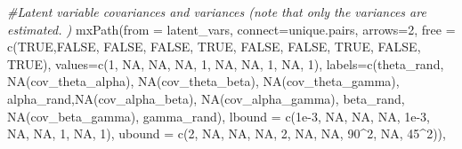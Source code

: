 \documentclass[
12pt, %
twoside,
english]{guelphthesis}
\newenvironment{Shaded}{\begin{snugshade}}{\end{snugshade}}
\newcommand{\AttributeTok}[1]{\textcolor[rgb]{0.77,0.63,0.00}{#1}}
\newcommand{\CommentTok}[1]{\textcolor[rgb]{0.56,0.35,0.01}{\textit{#1}}}
\newcommand{\ConstantTok}[1]{\textcolor[rgb]{0.00,0.00,0.00}{#1}}
\newcommand{\DecValTok}[1]{\textcolor[rgb]{0.00,0.00,0.81}{#1}}
\newcommand{\FloatTok}[1]{\textcolor[rgb]{0.00,0.00,0.81}{#1}}
\newcommand{\FunctionTok}[1]{\textcolor[rgb]{0.00,0.00,0.00}{#1}}
\newcommand{\NormalTok}[1]{#1}
\newcommand{\SpecialCharTok}[1]{\textcolor[rgb]{0.00,0.00,0.00}{#1}}
\newcommand{\StringTok}[1]{\textcolor[rgb]{0.31,0.60,0.02}{#1}}
\begin{document}
\begin{Shaded}
\begin{Highlighting}[numbers=left,,]
  \CommentTok{\#Latent variable covariances and variances (note that only the variances are estimated. )}
  \FunctionTok{mxPath}\NormalTok{(}\AttributeTok{from =}\NormalTok{ latent\_vars,}
         \AttributeTok{connect=}\StringTok{\textquotesingle{}unique.pairs\textquotesingle{}}\NormalTok{, }\AttributeTok{arrows=}\DecValTok{2}\NormalTok{,}
         \AttributeTok{free =} \FunctionTok{c}\NormalTok{(}\ConstantTok{TRUE}\NormalTok{,}\ConstantTok{FALSE}\NormalTok{, }\ConstantTok{FALSE}\NormalTok{, }\ConstantTok{FALSE}\NormalTok{, }
                  \ConstantTok{TRUE}\NormalTok{, }\ConstantTok{FALSE}\NormalTok{, }\ConstantTok{FALSE}\NormalTok{, }
                  \ConstantTok{TRUE}\NormalTok{, }\ConstantTok{FALSE}\NormalTok{, }
                  \ConstantTok{TRUE}\NormalTok{), }
         \AttributeTok{values=}\FunctionTok{c}\NormalTok{(}\DecValTok{1}\NormalTok{, }\ConstantTok{NA}\NormalTok{, }\ConstantTok{NA}\NormalTok{, }\ConstantTok{NA}\NormalTok{, }
                  \DecValTok{1}\NormalTok{, }\ConstantTok{NA}\NormalTok{, }\ConstantTok{NA}\NormalTok{, }
                  \DecValTok{1}\NormalTok{, }\ConstantTok{NA}\NormalTok{,}
                  \DecValTok{1}\NormalTok{),}
         \AttributeTok{labels=}\FunctionTok{c}\NormalTok{(}\StringTok{\textquotesingle{}theta\_rand\textquotesingle{}}\NormalTok{, }\StringTok{\textquotesingle{}NA(cov\_theta\_alpha)\textquotesingle{}}\NormalTok{, }\StringTok{\textquotesingle{}NA(cov\_theta\_beta)\textquotesingle{}}\NormalTok{, }
                  \StringTok{\textquotesingle{}NA(cov\_theta\_gamma)\textquotesingle{}}\NormalTok{,}
                  \StringTok{\textquotesingle{}alpha\_rand\textquotesingle{}}\NormalTok{,}\StringTok{\textquotesingle{}NA(cov\_alpha\_beta)\textquotesingle{}}\NormalTok{, }\StringTok{\textquotesingle{}NA(cov\_alpha\_gamma)\textquotesingle{}}\NormalTok{, }
                  \StringTok{\textquotesingle{}beta\_rand\textquotesingle{}}\NormalTok{, }\StringTok{\textquotesingle{}NA(cov\_beta\_gamma)\textquotesingle{}}\NormalTok{, }
                  \StringTok{\textquotesingle{}gamma\_rand\textquotesingle{}}\NormalTok{), }
         \AttributeTok{lbound =} \FunctionTok{c}\NormalTok{(}\FloatTok{1e{-}3}\NormalTok{, }\ConstantTok{NA}\NormalTok{, }\ConstantTok{NA}\NormalTok{, }\ConstantTok{NA}\NormalTok{, }
                    \FloatTok{1e{-}3}\NormalTok{, }\ConstantTok{NA}\NormalTok{, }\ConstantTok{NA}\NormalTok{, }
                    \DecValTok{1}\NormalTok{, }\ConstantTok{NA}\NormalTok{,}
                    \DecValTok{1}\NormalTok{), }
         \AttributeTok{ubound =} \FunctionTok{c}\NormalTok{(}\DecValTok{2}\NormalTok{, }\ConstantTok{NA}\NormalTok{, }\ConstantTok{NA}\NormalTok{, }\ConstantTok{NA}\NormalTok{, }
                    \DecValTok{2}\NormalTok{, }\ConstantTok{NA}\NormalTok{, }\ConstantTok{NA}\NormalTok{, }
                    \DecValTok{90}\SpecialCharTok{\^{}}\DecValTok{2}\NormalTok{, }\ConstantTok{NA}\NormalTok{, }
                    \DecValTok{45}\SpecialCharTok{\^{}}\DecValTok{2}\NormalTok{)),}
  

\end{Highlighting}
\end{Shaded}
\end{document}
